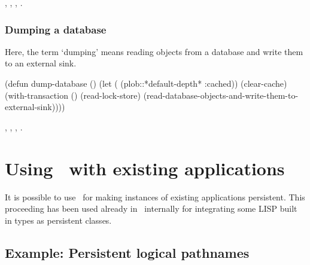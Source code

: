  {}, ,
, .

\subsubsection{Dumping a database}

Here, the term `dumping' means reading objects from a database and
write them to an external sink.

\begin{IndentedCompactCode}
(defun dump-database ()
  (let (
        (plob::*default-depth* :cached))
    (clear-cache) 
    (with-transaction ()
      (read-lock-store)
      (read-database-objects-and-write-them-to-external-sink))))
\end{IndentedCompactCode}

 {}, ,
, .

\section[PLOB in existing applications]%
{Using \protect\plob\ with existing applications}

It is possible to use \plob\ for making instances of existing
applications persistent. This proceeding has been used already in
\plob\ internally for integrating some LISP built in types as
persistent classes.

\subsection{Example: Persistent logical pathnames}

